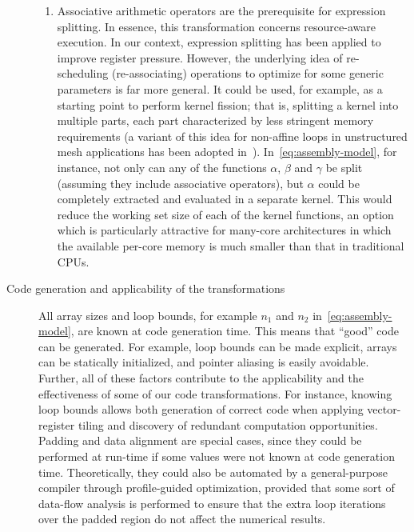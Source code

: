 \begin{description}
\begin{enumerate}
\item Associative arithmetic operators are the prerequisite for expression splitting. In essence, this transformation concerns resource-aware execution. In our context, expression splitting has been applied to improve register pressure. However, the underlying idea of re-scheduling (re-associating) operations to optimize for some generic parameters is far more general. It could be used, for example, as a starting point to perform kernel fission; that is, splitting a kernel into multiple parts, each part characterized by less stringent memory requirements (a variant of this idea for non-affine loops in unstructured mesh applications has been adopted in~\cite{op2-lcpc}). In~\eqref{eq:assembly-model}, for instance, not only can any of the functions $\alpha$, $\beta$ and $\gamma$ be split (assuming they include associative operators), but $\alpha$ could be completely extracted and evaluated in a separate kernel. This would reduce the working set size of each of the kernel functions, an option which is particularly attractive for many-core architectures in which the available per-core memory is much smaller than that in traditional CPUs.
\end{enumerate}
\item[Code generation and applicability of the transformations] All array sizes and loop bounds, for example $n_1$ and $n_2$ in~\eqref{eq:assembly-model}, are known at code generation time. This means that ``good'' code can be generated. For example, loop bounds can be made explicit, arrays can be statically initialized, and pointer aliasing is easily avoidable. Further, all of these factors contribute to the applicability and the effectiveness of some of our code transformations. For instance, knowing loop bounds allows both generation of correct code when applying vector-register tiling and discovery of redundant computation  opportunities. Padding and data alignment are special cases, since they could be performed at run-time if some values were not known at code generation time. Theoretically, they could also be automated by a general-purpose compiler through profile-guided optimization, provided that some sort of data-flow analysis is performed to ensure that the extra loop iterations over the padded region do not affect the numerical results. 

\end{description}
